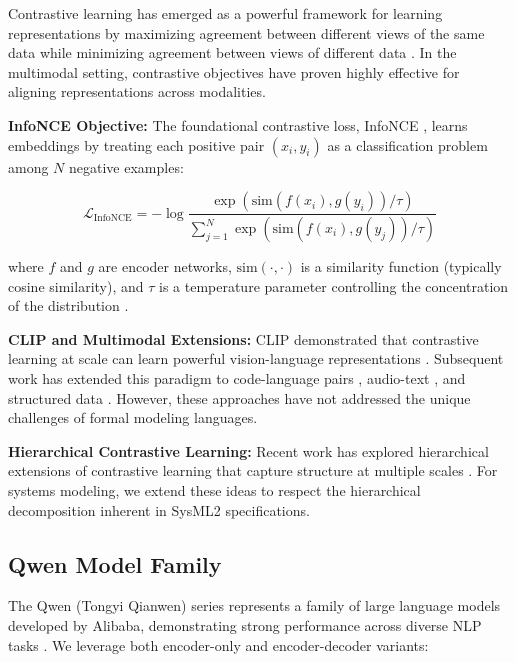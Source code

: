 \documentclass{article}
\begin{document}
Contrastive learning has emerged as a powerful framework for learning representations by maximizing agreement between different views of the same data while minimizing agreement between views of different data \cite{chen2020simple, he2020momentum}. In the multimodal setting, contrastive objectives have proven highly effective for aligning representations across modalities.

\textbf{InfoNCE Objective:} The foundational contrastive loss, InfoNCE \cite{oord2018representation}, learns embeddings by treating each positive pair $(x_i, y_i)$ as a classification problem among $N$ negative examples:

\begin{equation}
\mathcal{L}_{\text{InfoNCE}} = -\log \frac{\exp(\text{sim}(f(x_i), g(y_i))/\tau)}{\sum_{j=1}^{N} \exp(\text{sim}(f(x_i), g(y_j))/\tau)}
\end{equation}

where $f$ and $g$ are encoder networks, $\text{sim}(\cdot, \cdot)$ is a similarity function (typically cosine similarity), and $\tau$ is a temperature parameter controlling the concentration of the distribution \cite{radford2021learning}.

\textbf{CLIP and Multimodal Extensions:} CLIP demonstrated that contrastive learning at scale can learn powerful vision-language representations \cite{radford2021learning}. Subsequent work has extended this paradigm to code-language pairs \cite{chen2021evaluating}, audio-text \cite{wu2023large}, and structured data \cite{yin2018tranx}. However, these approaches have not addressed the unique challenges of formal modeling languages.

\textbf{Hierarchical Contrastive Learning:} Recent work has explored hierarchical extensions of contrastive learning that capture structure at multiple scales \cite{henaff2021efficient, tosh2021contrastive}. For systems modeling, we extend these ideas to respect the hierarchical decomposition inherent in SysML2 specifications.

\subsection{Qwen Model Family}

The Qwen (Tongyi Qianwen) series represents a family of large language models developed by Alibaba, demonstrating strong performance across diverse NLP tasks \cite{bai2023qwen}. We leverage both encoder-only and encoder-decoder variants:
\end{document}
